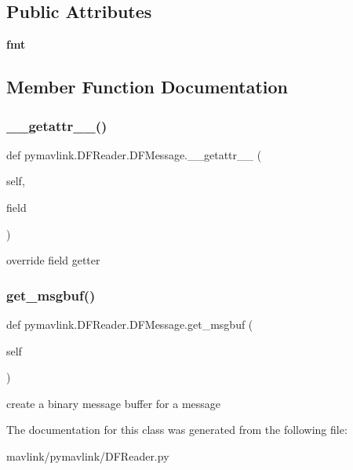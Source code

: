 \subsection*{Public Attributes}
\begin{DoxyCompactItemize}
\item 
\mbox{\label{classpymavlink_1_1DFReader_1_1DFMessage_a8f37e80929b490f8f9914e5c01fc7800}} 
{\bfseries fmt}
\end{DoxyCompactItemize}


\subsection{Member Function Documentation}
\mbox{\label{classpymavlink_1_1DFReader_1_1DFMessage_aeda9e43b0ace0421511eacc1b8701464}} 
\subsubsection{\texorpdfstring{\+\_\+\+\_\+getattr\+\_\+\+\_\+()}{\_\_getattr\_\_()}}
{\footnotesize\ttfamily def pymavlink.\+D\+F\+Reader.\+D\+F\+Message.\+\_\+\+\_\+getattr\+\_\+\+\_\+ (\begin{DoxyParamCaption}\item[{}]{self,  }\item[{}]{field }\end{DoxyParamCaption})}

\begin{DoxyVerb}override field getter\end{DoxyVerb}
 \mbox{\label{classpymavlink_1_1DFReader_1_1DFMessage_ab3d2d7f301462cc0343798a3d6486d8a}} 
\subsubsection{\texorpdfstring{get\+\_\+msgbuf()}{get\_msgbuf()}}
{\footnotesize\ttfamily def pymavlink.\+D\+F\+Reader.\+D\+F\+Message.\+get\+\_\+msgbuf (\begin{DoxyParamCaption}\item[{}]{self }\end{DoxyParamCaption})}

\begin{DoxyVerb}create a binary message buffer for a message\end{DoxyVerb}
 

The documentation for this class was generated from the following file\+:\begin{DoxyCompactItemize}
\item 
mavlink/pymavlink/D\+F\+Reader.\+py\end{DoxyCompactItemize}
